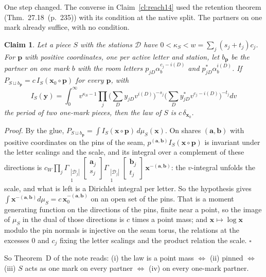 \documentclass[11pt]{article}
\newcommand{\Gst}[4]{\Gamma_{\substack{#1\\#2}}\!\begin{bmatrix}#3\\#4\end{bmatrix}}
\newcommand{\hb}[2]{#1~(p.~#2)}   %
\theoremstyle{plain}
\newtheorem{claim}{Claim}[section]
\theoremstyle{remark}
\begin{document}
One step changed. The converse in Claim~\ref{cl:reach14} used the retention theorem (Thm.~\hb{27.18}{235}) with its condition at the native split. The partners on one mark already suffice, with no condition.

\begin{claim}\label{cl:probe14}
Let a piece $S$ with the stations $\mathcal D$ have $0<\kappa_S<w=\sum_j(s_j+t_j)c_j$. For $\mathbf p$ with positive coordinates, one per active letter and station, let $b_{\mathbf p}$ be the partner on one mark $b$ with the room letters $p_{jD}\alpha_b^{c_j-i(D)}$ and $p^\ast_{jD}\alpha_b^{i(D)}$. If $P_{S\sqcup b_{\mathbf p}}=c\,I_S(\mathbf x_0\circ\mathbf p)$ for every $\mathbf p$, with
\[
I_S(\mathbf y)=\int_0^\infty v^{\kappa_S-1}\prod_j\Big(\sum_Dy_{jD}v^{i(D)}\Big)^{-s_j}\Big(\sum_Dy^\ast_{jD}v^{c_j-i(D)}\Big)^{-t_j}dv
\]
the period of two one-mark pieces, then the law of $S$ is $c\,\delta_{\mathbf x_0}$.
\end{claim}

\emph{Proof.} By the glue, $P_{S\sqcup b_{\mathbf p}}=\int I_S(\mathbf x\circ\mathbf p)\,d\mu_S(\mathbf x)$. On shares $(\mathbf a,\mathbf b)$ with positive coordinates on the pins of the seam, $p^{(\mathbf a,\mathbf b)}I_S(\mathbf x\circ\mathbf p)$ is invariant under the letter scalings and the scale, and its integral over a complement of these directions is $c_W\prod_j\Gst{|\mathcal D_j|}1{\mathbf a_j}{s_j}\Gst{|\mathcal D_j|}1{\mathbf b_j}{t_j}\,\mathbf x^{-(\mathbf a,\mathbf b)}$: the $v$-integral unfolds the scale, and what is left is a Dirichlet integral per letter. So the hypothesis gives $\int\mathbf x^{-(\mathbf a,\mathbf b)}d\mu_S=c\,\mathbf x_0^{-(\mathbf a,\mathbf b)}$ on an open set of the pins. That is a moment generating function on the directions of the pins, finite near a point, so the image of $\mu_S$ in the dual of those directions is $c$ times a point mass; and $\mathbf x\mapsto\log\mathbf x$ modulo the pin normals is injective on the seam torus, the relations at the excesses $0$ and $c_j$ fixing the letter scalings and the product relation the scale. $\square$

So Theorem~D of the note reads: (i) the law is a point mass $\Leftrightarrow$ (ii) pinned $\Leftrightarrow$ (iii) $S$ acts as one mark on every partner $\Leftrightarrow$ (iv) on every one-mark partner.
\end{document}
